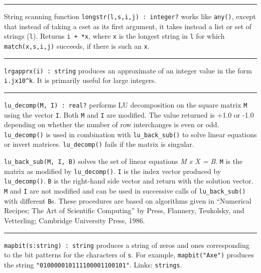 \vspace{0.25cm}\hrule{}

String scanning function \texttt{longstr(l,s,i,j) : integer?} works like
\texttt{any()}, except that instead of taking a cset as its first
argument, it takes instead a list or set of strings (\texttt{l}).
Returns \texttt{i + *x}, where \texttt{x} is the longest string in \texttt{l} for which \texttt{match(x,s,i,j)}
succeeds, if there is such an \texttt{x}.

\vspace{0.25cm}\hrule{}

\texttt{lrgapprx(i) : string} produces an approximate of an integer
value in the form \texttt{i.jx10\^{}k}. It is primarily useful for
large integers. 

\vspace{0.25cm}\hrule{}

\texttt{lu\_decomp(M, I) : real?} performs LU
decomposition on the square matrix \texttt{M} using the vector
\texttt{I}. Both \texttt{M} and \texttt{I} are modified. The value
returned is +1.0 or -1.0 depending on whether the number of row
interchanges is even or odd. \texttt{lu\_decomp()} is used in
combination with \texttt{lu\_back\_sub()} to solve linear equations or
invert matrices. \texttt{lu\_decomp()} fails if the matrix is singular.

\texttt{lu\_back\_sub(M, I, B)} solves the set of linear equations
\textit{M x X = B}. \texttt{M} is the matrix as modified by
\texttt{lu\_decomp()}. \texttt{I} is the index vector produced by
\texttt{lu\_decomp()}. \texttt{B} is the right-hand side vector and
return with the solution vector. \texttt{M} and \texttt{I} are not
modified and can be used in successive
calls of \texttt{lu\_back\_sub()} with different \texttt{B}s.
These procedures are based on algorithms given in
``Numerical Recipes; The Art of Scientific
Computing'' by Press, Flannery,
Teukolsky, and Vetterling; Cambridge University Press, 1986.


\vspace{0.25cm}\hrule{}

\texttt{mapbit(s:string) : string} produces a string of zeros and ones
corresponding to the bit patterns for the characters of \texttt{s}.
For example, \texttt{mapbit("Axe")} produces the string \linebreak
\texttt{"010000010111100001100101"}. Links:
\texttt{strings}. 

